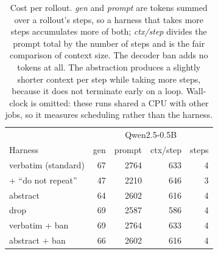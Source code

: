 
\begin{table}[t]
\centering
\small
\begin{tabular}{l r r r r}
\toprule
 & \multicolumn{4}{c}{Qwen2.5-0.5B} \\
Harness & gen & prompt & ctx/step & steps \\
\midrule
verbatim (standard) & 67 & 2764 & 633 & 4 \\
\quad + ``do not repeat'' & 47 & 2210 & 646 & 3 \\
abstract & 64 & 2602 & 616 & 4 \\
drop & 69 & 2587 & 586 & 4 \\
verbatim + ban & 69 & 2764 & 633 & 4 \\
abstract + ban & 66 & 2602 & 616 & 4 \\
\bottomrule
\end{tabular}
\caption{Cost per rollout. \emph{gen} and \emph{prompt} are tokens summed over a rollout's steps, so a harness that takes more steps accumulates more of both; \emph{ctx/step} divides the prompt total by the number of steps and is the fair comparison of context size. The decoder ban adds no tokens at all. The abstraction produces a slightly shorter context per step while taking more steps, because it does not terminate early on a loop. Wall-clock is omitted: these runs shared a CPU with other jobs, so it measures scheduling rather than the harness.}
\label{tab:cost}
\end{table}

